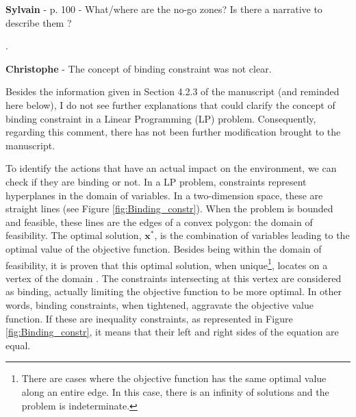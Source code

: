 \documentclass[12pt,a4paper]{article}
\begin{document}
\begin{mdframed}[style=comment] %
{\color{purple} \textbf{Sylvain}} - p. 100 - What/where are the no-go zones? Is there a narrative to describe them ?
\end{mdframed}

\noindent  {\color{blue} }. 

\begin{mdframed}[style=manuscript] %

\end{mdframed}

\begin{mdframed}[style=comment] %
{\color{violet} \textbf{Christophe}} - The concept of binding constraint was not clear.
\end{mdframed}

\noindent
Besides the information given in Section 4.2.3 of the manuscript (and reminded here below), I do not see further explanations that could clarify the concept of binding constraint in a Linear Programming (LP) problem. Consequently, regarding this comment, there has not been further modification brought to the manuscript.

\begin{mdframed}[style=manuscript] %
To identify the actions that have an actual impact on the environment, we can check if they are binding or not. In a LP problem, constraints represent hyperplanes in the domain of variables. In a two-dimension space, these are straight lines (see Figure \ref{fig:Binding_constr}). When the problem is bounded and feasible, these lines are the edges of a convex polygon: the domain of feasibility. The optimal solution, $\textbf{x}^*$, is the combination of variables leading to the optimal value of the objective function. Besides being within the domain of feasibility, it is proven that this optimal solution, when unique\footnote{There are cases where the objective function has the same optimal value along an entire edge. In this case, there is an infinity of solutions and the problem is indeterminate.}, locates on a vertex of the domain \cite{bertsimas1997introduction}. The constraints intersecting at this vertex are considered as binding, actually limiting the objective function to be more optimal. In other words, binding constraints, when tightened, aggravate the objective value function. If these are inequality constraints, as represented in Figure \ref{fig:Binding_constr}, it means that their left and right sides of the equation are equal.
\end{mdframed}
\end{document}
